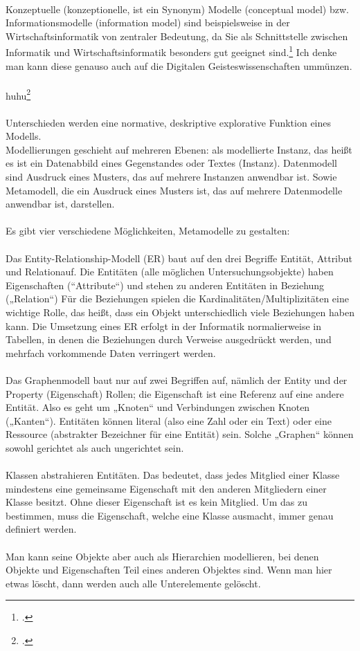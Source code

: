 \documentclass[12pt,a4paper]{article}
\begin{document}
\\
Konzeptuelle (konzeptionelle, ist ein Synonym) Modelle (conceptual model) bzw. Informationsmodelle (information model) sind beispielsweise in der Wirtschaftsinformatik von zentraler Bedeutung, da Sie als Schnittstelle zwischen Informatik und Wirtschaftsinformatik besonders gut geeignet sind.\footcite[][S.44-47]{kobler2010qualitat} Ich denke man kann diese genauso auch auf die Digitalen Geisteswissenschaften ummünzen.
\\
\\
huhu\footcite[Vgl][S.99-108]{jannidis2017digital} 
\\
\\
Unterschieden werden eine normative, deskriptive  explorative Funktion eines Modells.
\\
Modellierungen geschieht auf mehreren Ebenen: als modellierte Instanz, das heißt es ist ein Datenabbild eines Gegenstandes oder Textes (Instanz). Datenmodell sind Ausdruck eines Musters, das auf mehrere Instanzen anwendbar ist. Sowie Metamodell, die ein Ausdruck eines Musters ist, das auf mehrere Datenmodelle anwendbar ist, darstellen.
\\
\\
Es gibt vier verschiedene Möglichkeiten, Metamodelle zu gestalten:
\\
\\
Das Entity-Relationship-Modell (ER) baut auf den drei Begriffe Entität, Attribut und Relationauf. Die Entitäten (alle möglichen Untersuchungsobjekte) haben Eigenschaften (“Attribute“) und stehen zu anderen Entitäten in Beziehung („Relation“) Für die Beziehungen spielen die Kardinalitäten/Multiplizitäten eine wichtige Rolle, das heißt, dass ein Objekt unterschiedlich viele Beziehungen haben kann. Die Umsetzung eines ER erfolgt in der Informatik normalierweise in Tabellen, in denen die Beziehungen durch Verweise ausgedrückt werden, und mehrfach vorkommende Daten verringert werden.
\\
\\
Das Graphenmodell baut nur auf zwei Begriffen auf, nämlich der Entity und der Property (Eigenschaft) Rollen; die Eigenschaft ist eine Referenz auf eine andere Entität. Also es geht um „Knoten“ und Verbindungen zwischen Knoten („Kanten“). Entitäten können literal (also eine Zahl oder ein Text) oder eine Ressource (abstrakter Bezeichner für eine Entität) sein. Solche „Graphen“ können sowohl gerichtet als auch ungerichtet sein.
\\
\\
Klassen abstrahieren Entitäten. Das bedeutet, dass jedes Mitglied einer Klasse mindestens eine gemeinsame Eigenschaft mit den anderen Mitgliedern einer Klasse besitzt. Ohne dieser Eigenschaft ist es kein Mitglied. Um das zu bestimmen, muss die Eigenschaft, welche eine Klasse ausmacht, immer genau definiert werden.
\\
\\
Man kann seine Objekte aber auch als Hierarchien modellieren, bei denen Objekte und Eigenschaften Teil eines anderen Objektes sind. Wenn man hier etwas löscht, dann werden auch alle Unterelemente gelöscht.
\end{document}
